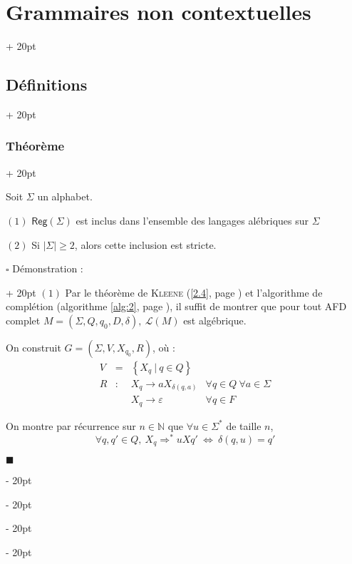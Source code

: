 \documentclass[a4paper, 12pt, twoside]{article}
\newcommand{\N}{\mathbb{N}} %
\newcommand{\lr}[1]{\left( #1 \right)}
\newcommand{\set}[1]{\left\{ #1 \right\}}
\newcommand{\abs}[1]{\left\lvert #1 \right\rvert}
\newcommand{\ssi}{\ \Leftrightarrow \ }
\renewcommand{\ge}{\geqslant}
\newcommand{\ind}[1][20pt]{\advance\leftskip + #1}
\newcommand{\deind}[1][20pt]{\advance\leftskip - #1}
\newenvironment{indt}[2][20pt]{#2 \par \ind[#1]}{\par \deind} %
\newenvironment{proof}[1][{Démonstration :}]{\begin{indt}{$\square$ #1}}{$\blacksquare$ \end{indt}}
\newcommand{\Reg}{\mathsf{Reg}}
\begin{document}
\begin{indt}{\section{Grammaires non contextuelles}}
\begin{indt}{\subsection{Définitions}}
            \vspace{12pt}
            
            \begin{indt}{\subsubsection{Théorème}}
                \begin{emphBox}
                    Soit $\Sigma$ un alphabet.
                    
                    $(1)$ $\Reg(\Sigma)$ est inclus dans l'ensemble des langages alébriques sur $\Sigma$
                    
                    $(2)$ Si $\abs \Sigma \ge 2$, alors cette inclusion est stricte.
                \end{emphBox}

                \vspace{6pt}
                
                \begin{proof}
                    $(1)$ Par le théorème de \textsc{Kleene} (\ref{2.4}, page \pageref{2.4}) et l'algorithme de complétion (algorithme \ref{alg:2}, page \pageref{alg:2}), il suffit de montrer que pour tout AFD complet $M = \lr{\Sigma, Q, q_0, D, \delta},\ \mathcal L(M)$ est algébrique.

                    On construit $G = \lr{\Sigma, V, X_{q_0}, R}$, où :
                    \[
                        \begin{array}{rcll}
                            V &=& \set{X_q\ |\ q \in Q}
                            \\
                            R &:& X_q \rightarrow aX_{\delta(q, a)} & \forall q \in Q\ \forall a \in \Sigma
                            \\
                              && X_q \rightarrow \varepsilon & \forall q \in F
                        \end{array}
                    \]

                    On montre par récurrence sur $n \in \N$ que $\forall u \in \Sigma^*$ de taille $n$,
                    \[
                        \forall q, q' \in Q,\ X_q \Rightarrow^* uXq' \ssi \delta(q, u) = q'
                    \]

                    \vspace{6pt}
                    

\end{proof}
\end{indt}
\end{indt}
\end{indt}
\end{document}
